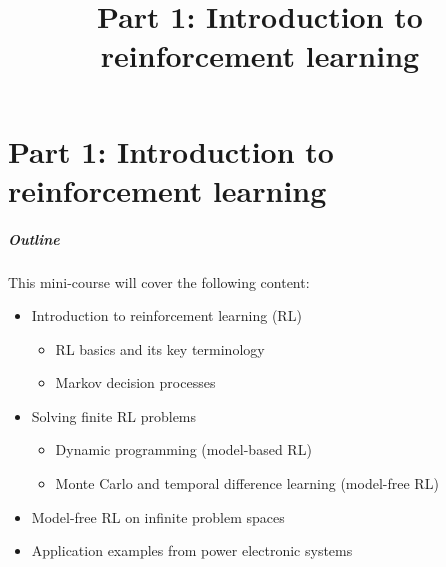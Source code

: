 \part{Part 1: Introduction to reinforcement learning}
\title[Part 1: Intro to RL]{Part 1: Introduction to reinforcement learning}  
\date{}  
\frame{\titlepage} 

\begin{frame}
	\frametitle{Outline}
	This mini-course will cover the following content:
	\vspace{0.5cm}
	\begin{itemize}
			\item Introduction to reinforcement learning (RL)
			\begin{itemize}
				\item RL basics and its key terminology 
				\item Markov decision processes \pause
			\end{itemize}
			\vspace{0.25cm}
			\item Solving finite RL problems 
			\begin{itemize}
				\item Dynamic programming (model-based RL) 
				\item Monte Carlo and temporal difference learning (model-free RL) \pause
			\end{itemize} 
			\vspace{0.25cm}
			\item Model-free RL on infinite problem spaces \pause
			\vspace{0.25cm} 
			\item Application examples from power electronic systems
		\end{itemize}
	\end{frame}
